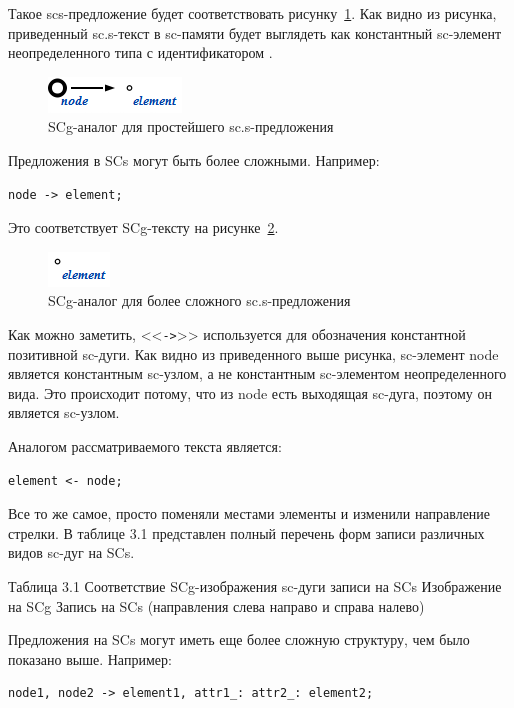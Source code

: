 Такое scs-предложение будет соответствовать
рисунку~\ref{fig:SCs_simple_sentence}. Как видно из рисунка,
приведенный sc.s-текст в sc-памяти будет выглядеть как константный
sc-элемент неопределенного типа с идентификатором .

\begin{figure}[h!]
  \centering
  \includegraphics{images/5/scs/simple_sentence}
  \caption{SCg-аналог для простейшего sc.s-предложения}
  \label{fig:SCs_simple_sentence}
\end{figure}

Предложения в SCs могут быть более сложными. Например:
\begin{verbatim}
node -> element;
\end{verbatim}

Это соответствует SCg-тексту на рисунке~\ref{fig:SCs_sentence}.

\begin{figure}[h!]
  \centering
  \includegraphics{images/5/scs/sentence}
  \caption{SCg-аналог для более сложного sc.s-предложения}
  \label{fig:SCs_sentence}
\end{figure}

Как можно заметить, <<\texttt{->}>> используется для обозначения
константной позитивной sc-дуги. Как видно из приведенного выше
рисунка, sc-элемент node является константным sc-узлом, а не
константным sc-элементом неопределенного вида. Это происходит потому,
что из node есть выходящая sc-дуга, поэтому он является sc-узлом.

Аналогом рассматриваемого текста является:
\begin{verbatim}
element <- node;
\end{verbatim}

Все то же самое, просто поменяли местами элементы и изменили
направление стрелки. В таблице 3.1 представлен полный перечень форм
записи различных видов sc-дуг на SCs.

Таблица 3.1 Соответствие SCg-изображения sc-дуги записи на SCs
Изображение на SCg  Запись на SCs (направления слева направо и справа налево)


Предложения на SCs могут иметь еще более сложную структуру, чем было
показано выше. Например:
\begin{verbatim}
node1, node2 -> element1, attr1_: attr2_: element2;
\end{verbatim}

